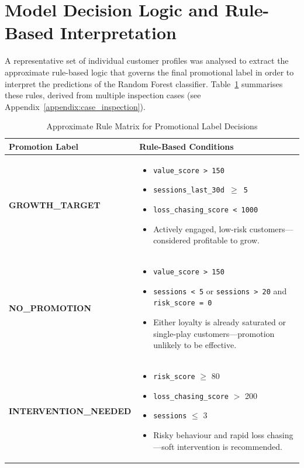\documentclass[12pt,a4paper]{report}
\begin{document}
\section{Model Decision Logic and Rule-Based Interpretation}
\label{sec:model_logic}

A representative set of individual customer profiles was analysed to extract the approximate rule-based logic that governs the final promotional label in order to interpret the predictions of the Random Forest classifier. Table~\ref{tab:decision_logic_matrix} summarises these rules, derived from multiple inspection cases (see Appendix~\ref{appendix:case_inspection}).


\vspace{0.5em}
\begin{table}[H]
\centering
\caption{Approximate Rule Matrix for Promotional Label Decisions}
\label{tab:decision_logic_matrix}
\renewcommand{\arraystretch}{1.4}
\begin{tabular}{p{4.3cm} p{9.5cm}}
\toprule
\textbf{Promotion Label} & \textbf{Rule-Based Conditions} \\
\midrule
\textbf{GROWTH\_TARGET} & 
\begin{itemize}[noitemsep, topsep=0pt]
    \item \texttt{value\_score > 150}
    \item \texttt{sessions\_last\_30d $\geq$ 5}
    \item \texttt{loss\_chasing\_score < 1000}
    \item Actively engaged, low-risk customers—considered profitable to grow.
\end{itemize}
\\

\textbf{NO\_PROMOTION} & 
\begin{itemize}[noitemsep, topsep=0pt]
    \item \texttt{value\_score > 150}
    \item \texttt{sessions < 5} or \texttt{sessions > 20} and \texttt{risk\_score = 0}
    \item Either loyalty is already saturated or single-play customers—promotion unlikely to be effective.
\end{itemize}
\\

\textbf{INTERVENTION\_NEEDED} & 
\begin{itemize}[noitemsep, topsep=0pt]
    \item \texttt{risk\_score} $\geq$ 80
    \item \texttt{loss\_chasing\_score} $>$ 200
    \item \texttt{sessions} $\leq$ 3
    \item Risky behaviour and rapid loss chasing—soft intervention is recommended.
\end{itemize}
\\


\end{tabular}
\end{table}
\end{document}
